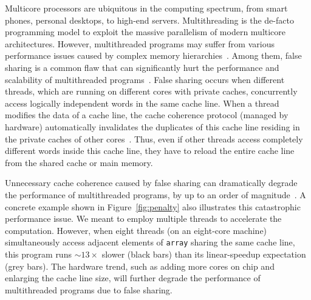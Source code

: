 Multicore processors are ubiquitous in the computing spectrum, from smart phones, personal desktops, to high-end servers. Multithreading is the de-facto programming model to exploit the massive parallelism of modern multicore architectures.
However, multithreaded programs may suffer from various performance issues caused by complex memory hierarchies~\cite{ibs-sc,ibs-sc2,Dramon}. Among them, false sharing is a common flaw that can significantly hurt the performance and scalability of multithreaded programs~\cite{falseshare:effect}. False sharing occurs when different threads, which are running on different cores with private caches, concurrently access logically independent words in the same cache line. When a thread modifies the data of a cache line, the cache coherence protocol (managed by hardware) automatically invalidates the duplicates of this cache line residing in the private caches of other cores~\cite{MESI}. Thus, even if other threads access completely different words inside this cache line, they have to reload the entire cache line from the shared cache or main memory. 

Unnecessary cache coherence caused by false sharing can dramatically degrade the performance of multithreaded programs, by up to an order of magnitude~\cite{falseshare:effect}. A concrete example shown in Figure~\ref{fig:penalty} also illustrates this catastrophic performance issue. We meant to employ multiple threads to accelerate the computation. However, when eight threads (on an eight-core machine) simultaneously access adjacent elements of {\tt array} sharing the same cache line, this program runs $\sim13\times$ slower (black bars) than its linear-speedup expectation (grey bars).
The hardware trend, such as adding more cores on chip and enlarging the cache line size, will further degrade the performance of multithreaded programs due to false sharing.

